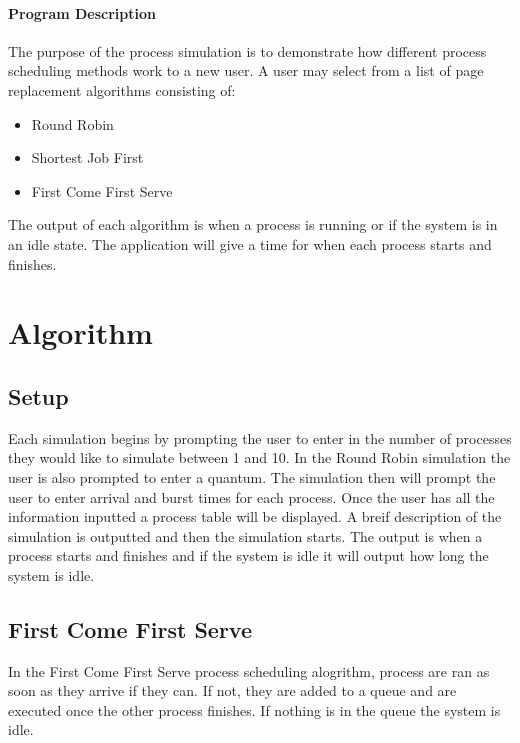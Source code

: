 






\begin{multicols}{2}

\paragraph{Program Description}
The purpose of the process simulation is to demonstrate how different process scheduling methods work to a new user. A user may select from a list of page replacement algorithms consisting of:
\begin{itemize}
\item Round Robin
\item Shortest Job First
\item First Come First Serve

\end{itemize}

The output of each algorithm is when a process is running or if the system is in an idle state. The application will give a time for when each process starts and finishes.


\section{Algorithm}\label{algorithm}
\subsection{Setup}

Each simulation begins by prompting the user to enter in the number of processes they would like to simulate between 1 and 10. In the Round Robin simulation the user is also prompted to enter a quantum. The simulation then will prompt the user to enter arrival and burst times for each process. Once the user has all the information inputted a process table will be displayed.
A breif description of the simulation is outputted and then the simulation starts. The output is when a process starts and finishes and if the system is idle it will output how long the system is idle.

\subsection{First Come First Serve}
In the First Come First Serve process scheduling alogrithm, process are ran as soon as they arrive if they can. If not, they are added to a queue and are executed once the other process finishes. If nothing is in the queue the system is idle.


\end{multicols}
